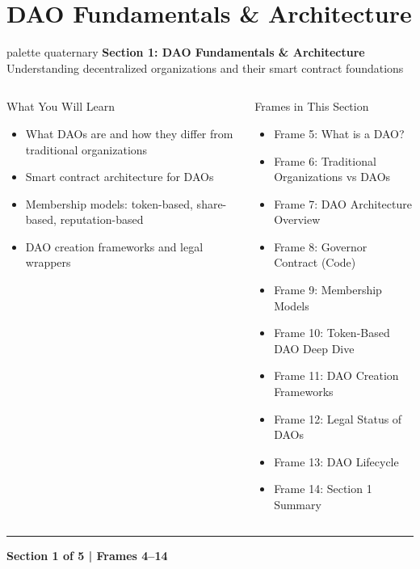 \documentclass[8pt,aspectratio=169]{beamer}
\newcommand{\bottomnote}[1]{\vfill\vspace{-2mm}\textcolor{mllavender2}{\rule{\textwidth}{0.4pt}}\vspace{1mm}\footnotesize\textbf{#1}}
\begin{document}
\section{DAO Fundamentals \& Architecture}

\begin{frame}{}
\begin{beamercolorbox}[sep=12pt,center,rounded=true,shadow=true]{palette quaternary}
  {\Large\bfseries Section 1: DAO Fundamentals \& Architecture}\\[6pt]
  {\normalsize Understanding decentralized organizations and their smart contract foundations}
\end{beamercolorbox}
\vspace{4mm}
\begin{columns}[T]
\begin{block}{What You Will Learn}
\footnotesize
\begin{itemize}
  \item What DAOs are and how they differ from traditional organizations
  \item Smart contract architecture for DAOs
  \item Membership models: token-based, share-based, reputation-based
  \item DAO creation frameworks and legal wrappers
\end{itemize}
\end{block}
\begin{block}{Frames in This Section}
\footnotesize
\begin{itemize}
  \item Frame 5: What is a DAO?
  \item Frame 6: Traditional Organizations vs DAOs
  \item Frame 7: DAO Architecture Overview
  \item Frame 8: Governor Contract (Code)
  \item Frame 9: Membership Models
  \item Frame 10: Token-Based DAO Deep Dive
  \item Frame 11: DAO Creation Frameworks
  \item Frame 12: Legal Status of DAOs
  \item Frame 13: DAO Lifecycle
  \item Frame 14: Section 1 Summary
\end{itemize}
\end{block}
\end{columns}
\bottomnote{Section 1 of 5 | Frames 4--14}
\end{frame}
\end{document}

